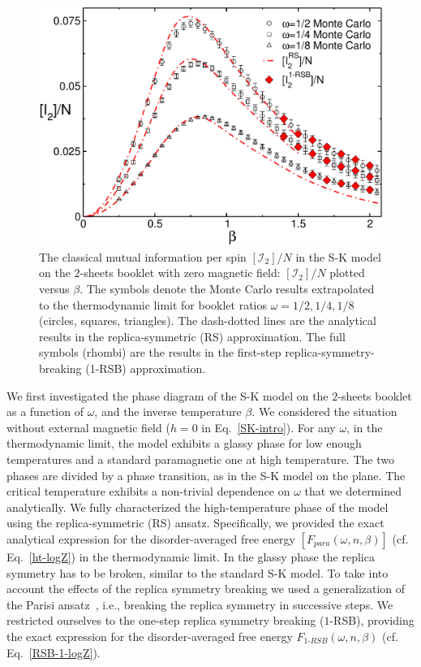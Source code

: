 \documentclass[twocolumn,superscriptaddress,prb,10pt]{revtex4-1}
\begin{document}
\begin{figure}[t]
\includegraphics*[width=0.93\linewidth]{./draft_figs/I2_extrapolated}
\caption{The classical mutual information per spin $[{\mathcal I}_2]/N$ 
 in the S-K model on the $2$-sheets booklet with zero magnetic field: 
 $[{\mathcal I}_2]/N$ plotted versus $\beta$. The symbols denote the 
 Monte Carlo results extrapolated to the thermodynamic limit for 
 booklet ratios $\omega=1/2,1/4,1/8$ (circles, squares, triangles). 
 The dash-dotted lines are the analytical results in the 
 replica-symmetric (RS) approximation. The full symbols (rhombi) 
 are the results in the first-step replica-symmetry-breaking (1-RSB) 
 approximation.
}
\label{I2-extrapolated}
\end{figure}


We first investigated the phase diagram of the S-K model on the $2$-sheets booklet as a 
function of $\omega$, and the inverse temperature $\beta$. We considered the situation 
without external magnetic field ($h=0$ in Eq.~\eqref{SK-intro}). For any $\omega$, in the 
thermodynamic limit, the model exhibits a glassy phase for low enough temperatures and 
a standard paramagnetic one at high temperature. The two phases are divided 
by a phase transition, as in the S-K model on the plane. The critical temperature exhibits 
a non-trivial dependence on $\omega$ that we determined analytically. We fully characterized 
the high-temperature phase of the model using the replica-symmetric (RS) ansatz. Specifically, 
we provided the exact analytical expression for the disorder-averaged free energy 
$[F_{para}(\omega,n,\beta)]$  (cf. Eq.~\eqref{ht-logZ}) in the thermodynamic limit. In the 
glassy phase the replica symmetry has to be broken, similar to the standard S-K model. To take 
into account the effects of the replica symmetry breaking we used a generalization of the 
Parisi ansatz~\cite{parisi-1980}, i.e., breaking the replica symmetry in successive steps. 
We restricted ourselves to the one-step replica symmetry breaking ($1$-RSB), providing the 
exact expression for the disorder-averaged free energy $F_{1\textrm{-}RSB}(\omega,n,\beta)$ 
(cf. Eq.~\eqref{RSB-1-logZ}). 
\end{document}
